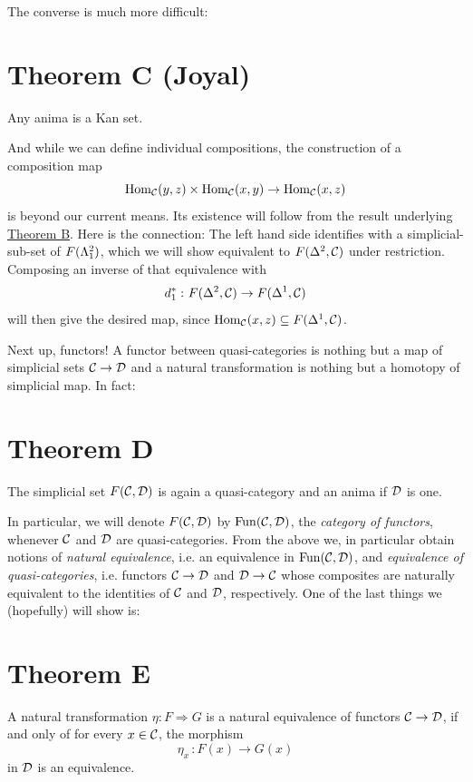         The converse is much more difficult:

        \section{Theorem C (Joyal)}\label{chIII-thm-c}
        Any anima is a Kan set.
        \smallskip

        And while we can define individual compositions, the construction of a composition map
        \begin{equation*}
            \operatorname{Hom}_{\mathcal{C}}(y, z) \times \operatorname{Hom}_{\mathcal{C}}(x, y) \to \operatorname{Hom}_{\mathcal{C}}(x, z)
        \end{equation*}
        is beyond our current means. Its existence will follow from the result underlying \hyperref[chIII-6]{Theorem B}. Here is the connection: The left hand side identifies with a simplicial-sub-set of $F(\Lambda^{2}_{1})$, which we will show equivalent to $F(\Delta^2, \mathcal{C})$ under restriction. Composing an inverse of that equivalence with
        \begin{equation*}
            d_1^* \,\colon F(\Delta^2, \mathcal{C}) \to F(\Delta^1, \mathcal{C})
        \end{equation*}
        will then give the desired map, since $\operatorname{Hom}_{\mathcal{C}}(x, z) \subseteq F(\Delta^1, \mathcal{C})$.
        \medskip

        Next up, functors! A functor between quasi-categories is nothing but a map of simplicial sets $\mathcal{C} \to  \mathcal{D}$ and a natural transformation is nothing but a homotopy of simplicial map. In fact:

        \section{Theorem D}\label{chIII-12}
        The simplicial set $F(\mathcal{C}, \mathcal{D})$ is again a quasi-category and an anima if $\mathcal{D}$ is one.
        \smallskip

        In particular, we will denote $F(\mathcal{C}, \mathcal{D})$ by $\operatorname{Fun}(\mathcal{C}, \mathcal{D})$, the \emph{category of functors}, whenever $\mathcal{C}$ and $\mathcal{D}$ are quasi-categories. From the above we, in particular obtain notions of \emph{natural equivalence}, i.e. an equivalence in $\operatorname{Fun}(\mathcal{C}, \mathcal{D})$, and \emph{equivalence of quasi-categories}, i.e. functors $\mathcal{C} \to \mathcal{D}$ and $\mathcal{D} \to \mathcal{C}$ whose composites are naturally equivalent to the identities of $\mathcal{C}$ and $\mathcal{D}$, respectively. One of the last things we (hopefully) will show is:

        \section{Theorem E}\label{chIII-thm-e}
        A natural transformation $\eta \colon F \Rightarrow G$ is a natural equivalence of functors $\mathcal{C} \to \mathcal{D}$, if and only of for every $x \in \mathcal{C}$, the morphism
        \begin{equation*}
            \eta_x \,\colon F(x) \to G(x)
        \end{equation*}
        in $\mathcal{D}$ is an equivalence.

